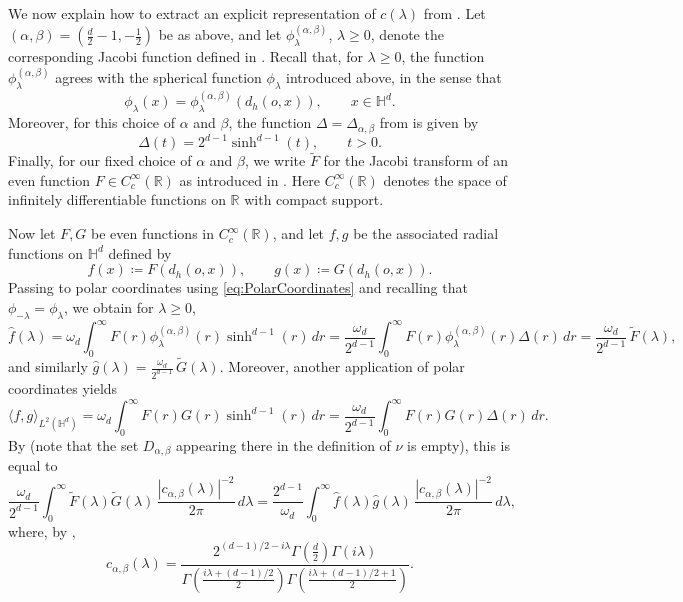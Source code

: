 \documentclass[11pt,a4paper]{article}
\theoremstyle{plain}
\theoremstyle{definition}
\theoremstyle{remark}
\def\HH{\mathbb{H}}
\def\RR{\mathbb{R}}
\begin{document}
We now explain how to extract an explicit representation of \(c(\lambda)\) from \cite{Koornwinder}.
Let \((\alpha,\beta)=\left(\frac{d}{2}-1,-\frac{1}{2}\right)\) be as above, and let \(\phi^{(\alpha,\beta)}_\lambda\), \(\lambda\geq 0\), denote the corresponding Jacobi function defined in \cite[Equation (2.4)]{Koornwinder}.
Recall that, for \(\lambda\geq 0\), the function \(\phi^{(\alpha,\beta)}_\lambda\) agrees with the spherical function \(\phi_\lambda\) introduced above, in the sense that
\[
\phi_\lambda(x)=\phi^{(\alpha,\beta)}_\lambda(d_h(o,x)),
\qquad x\in\HH^d.
\]
Moreover, for this choice of \(\alpha\) and \(\beta\), the function \(\Delta=\Delta_{\alpha,\beta}\) from \cite[Equation (2.5)]{Koornwinder} is given by
\[
\Delta(t)=2^{d-1}\sinh^{d-1}(t),
\qquad t>0.
\]
Finally, for our fixed choice of \(\alpha\) and \(\beta\), we write \(\widetilde F\) for the Jacobi transform of an even function \(F\in C_c^\infty(\RR)\) as introduced in \cite[Equation (2.12)]{Koornwinder}. Here \(C_c^\infty(\RR)\) denotes the space of infinitely differentiable functions on \(\RR\) with compact support.

Now let \(F,G\) be even functions in \(C_c^\infty(\RR)\), and let \(f,g\) be the associated radial functions on \(\HH^d\) defined by
\[
f(x)\coloneqq F(d_h(o,x)),
\qquad
g(x)\coloneqq G(d_h(o,x)).
\]
Passing to polar coordinates using \eqref{eq:PolarCoordinates} and recalling that \(\phi_{-\lambda}=\phi_\lambda\), we obtain for \(\lambda\geq 0\),
\[
\widehat f(\lambda)
= \omega_d \int_0^\infty F(r)\phi_\lambda^{(\alpha,\beta)}(r)\sinh^{d-1}(r)\,dr
= \frac{\omega_d}{2^{d-1}} \int_0^\infty F(r)\phi_\lambda^{(\alpha,\beta)}(r)\Delta(r)\,dr
= \frac{\omega_d}{2^{d-1}}\,\widetilde F(\lambda),
\]
and similarly $\widehat g(\lambda)=\frac{\omega_d}{2^{d-1}}\,\widetilde G(\lambda)$. Moreover, another application of polar coordinates yields
\[
\langle f,g\rangle_{L^2(\HH^d)}
= \omega_d \int_0^\infty F(r)G(r)\sinh^{d-1}(r)\,dr
= \frac{\omega_d}{2^{d-1}} \int_0^\infty F(r)G(r)\Delta(r)\,dr.
\]
By \cite[Theorem 2.4]{Koornwinder} (note that the set \(D_{\alpha,\beta}\) appearing there in the definition of \(\nu\) is empty), this is equal to
\[
\frac{\omega_d}{2^{d-1}}
\int_0^\infty
\widetilde F(\lambda)\widetilde G(\lambda)\,
\frac{|c_{\alpha,\beta}(\lambda)|^{-2}}{2\pi}\,d\lambda
=
\frac{2^{d-1}}{\omega_d}
\int_0^\infty
\widehat f(\lambda)\widehat g(\lambda)\,
\frac{|c_{\alpha,\beta}(\lambda)|^{-2}}{2\pi}\,d\lambda,
\]
where, by \cite[Equation (2.18)]{Koornwinder},
\[
c_{\alpha,\beta}(\lambda)
=
\frac{2^{(d-1)/2-i\lambda}\Gamma(\frac{d}{2})\Gamma(i\lambda)}
{\Gamma\!\left(\frac{i\lambda+(d-1)/2}{2}\right)
\Gamma\!\left(\frac{i\lambda+(d-1)/2+1}{2}\right)}.
\]
\end{document}

